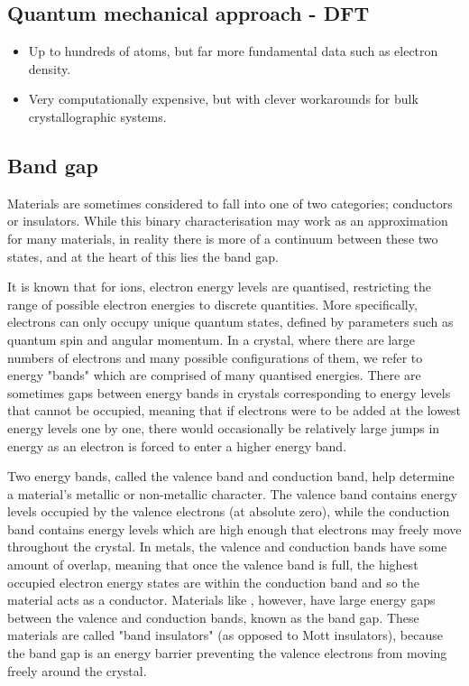 \subsection{Quantum mechanical approach - DFT}

\begin{itemize}
\item Up to hundreds of atoms, but far more fundamental data such as electron density.
\item Very computationally expensive, but with clever workarounds for bulk crystallographic systems.
\end{itemize}

\subsection{Band gap}

Materials are sometimes considered to fall into one of two categories; conductors or insulators. While this binary characterisation may work as an approximation for many materials, in reality there is more of a continuum between these two states, and at the heart of this lies the band gap.

It is known that for ions, electron energy levels are quantised, restricting the range of possible electron energies to discrete quantities. More specifically, electrons can only occupy unique quantum states, defined by parameters such as quantum spin and angular momentum. In a crystal, where there are large numbers of electrons and many possible configurations of them, we refer to energy "bands" which are comprised of many quantised energies. There are sometimes gaps between energy bands in crystals corresponding to energy levels that cannot be occupied, meaning that if electrons were to be added at the lowest energy levels one by one, there would occasionally be relatively large jumps in energy as an electron is forced to enter a higher energy band. 

Two energy bands, called the valence band and conduction band, help determine a material's metallic or non-metallic character. The valence band contains energy levels occupied by the valence electrons (at absolute zero), while the conduction band contains energy levels which are high enough that electrons may freely move throughout the crystal. In metals, the valence and conduction bands have some amount of overlap, meaning that once the valence band is full, the highest occupied electron energy states are within the conduction band and so the material acts as a conductor. Materials like \zirconia , however, have large energy gaps between the valence and conduction bands, known as the band gap. These materials are called "band insulators" (as opposed to Mott insulators), because the band gap is an energy barrier preventing the valence electrons from moving freely around the crystal.

